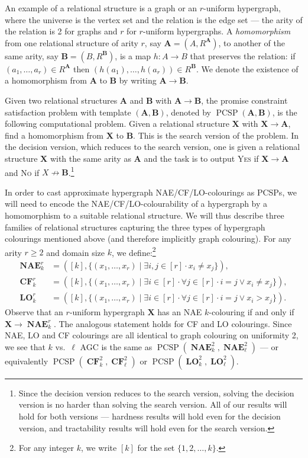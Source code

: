 \documentclass[a4paper,11pt]{article}
\newcommand{\2}{\vec{2}}
\newcommand{\1}{\vec{1}}
\newcommand{\0}{\vec{0}}
\renewcommand{\A}{\ensuremath{\mathbf{A}}}
\newcommand{\B}{\ensuremath{\mathbf{B}}}
\newcommand{\X}{\ensuremath{\mathbf{X}}}
\DeclareMathOperator{\PCSP}{PCSP}
\DeclareMathOperator{\NAE}{\mathbf{NAE}}
\DeclareMathOperator{\CF}{\mathbf{CF}}
\DeclareMathOperator{\LO}{\mathbf{LO}}
\theoremstyle{plain}
\theoremstyle{definition}
\begin{document}
An example of a relational structure is a graph or an $r$-uniform hypergraph, where the universe is the vertex set and the relation is the edge set --- the arity of the relation is 2 for graphs and $r$ for $r$-uniform hypergraphs. A \emph{homomorphism} from one relational structure of arity $r$, say $\A=(A,R^\A)$, to another of the same arity, say $\B=(B,R^\B)$, is a map $h:A\to B$ that preserves the relation: if $(a_1,\ldots,a_r)\in R^{\A}$ then $(h(a_1),\ldots,h(a_r))\in R^{\B}$. We denote the existence of a homomorphism from $\A$ to $\B$ by writing $\A\to\B$.

Given two relational structures $\A$ and $\B$ with $\A\to\B$, the promise constraint satisfaction problem with template $(\A,\B)$, denoted by $\PCSP(\A,\B)$, is the following computational problem. Given a relational structure $\X$ with $\X \to \A$, find a homomorphism from $\X$ to $\B$. This is the search version of the problem. In the decision version, which reduces to the search version, one is given a relational structure $\X$ with the same arity as $\A$ and the task is to output \textsc{Yes} if $\X\to\A$ and \textsc{No} if $X\not\to\B$.\footnote{Since the decision version reduces to the search version, solving the decision version is no harder than solving the search version. All of our results will hold for both versions --- hardness results will hold even for the decision version, and tractability results will hold even for the search version.}

In order to cast approximate hypergraph NAE/CF/LO-colourings as PCSPs, we will need to encode the NAE/CF/LO-colourability of a hypergraph by a homomorphism to a suitable relational structure.
We will thus describe three families of relational structures capturing the three types of hypergraph colourings mentioned above (and therefore implicitly graph colouring).
For any arity $r\geq 2$ and domain size $k$, we define:\footnote{For any integer $k$, we write $[k]$ for the set $\{1,2,\ldots,k\}$.}
\begin{align*}
    \NAE^r_k &= ([k], \{ (x_1, \ldots, x_r) \mid \exists i, j \in [r] \cdot x_i \neq x_j \}), \\
    \CF^r_k &= ([k], \{ (x_1, \ldots, x_r) \mid \exists i \in [r] \cdot \forall j \in [r] \cdot i = j \lor x_i \neq x_j \}), \\
    \LO^r_k &= ([k], \{ (x_1, \ldots, x_r) \mid \exists i \in [r] \cdot \forall j \in [r] \cdot i = j \lor x_i > x_j \}).
\end{align*}
Observe that an $r$-uniform hypergraph $\X$ has an NAE $k$-colouring if and only if $\X \to \NAE^r_k$. The analogous statement holds for CF and LO colourings. Since NAE, LO and CF colourings are all identical to graph colouring on uniformity 2, we see that $k$ vs.~$\ell$ AGC is the same as $\PCSP(\NAE^2_k, \NAE^2_\ell)$ --- or equivalently $\PCSP(\CF^2_k, \CF^2_\ell)$ or $\PCSP(\LO^2_k, \LO^2_\ell)$.
\end{document}
